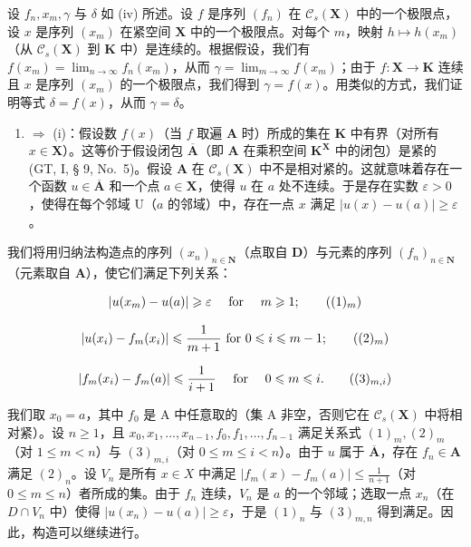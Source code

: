 设 \(f_n, x_m, \gamma\) 与 \(\delta\) 如 (iv) 所述。设 \(f\) 是序列 \((f_n)\) 在 \(\mathcal{C}_s(\mathbf{X})\) 中的一个极限点，设 \(x\) 是序列 \((x_m)\) 在紧空间 \(\mathbf{X}\) 中的一个极限点。对每个 \(m\)，映射 \(h \mapsto h(x_m)\)（从 \(\mathcal{C}_s(\mathbf{X})\) 到 \(\mathbf{K}\) 中）是连续的。根据假设，我们有 \(f(x_m) = \lim_{n \to \infty} f_n(x_m)\)，从而 \(\gamma = \lim_{m \to \infty} f(x_m)\)；由于 \(f: \mathbf{X} \to \mathbf{K}\) 连续且 \(x\) 是序列 \((x_m)\) 的一个极限点，我们得到 \(\gamma = f(x)\)。用类似的方式，我们证明等式 \(\delta = f(x)\)，从而 \(\gamma = \delta\)。

\begin{enumerate}
\def\labelenumi{(\roman{enumi})}
\setcounter{enumi}{3}
\tightlist
\item
  \(\Rightarrow\) (i)：假设数 \(f(x)\)（当 \(f\) 取遍 \(\mathbf{A}\) 时）所成的集在 \(\mathbf{K}\) 中有界（对所有 \(x\in \mathbf{X}\)）。这等价于假设闭包 \(\overline{\mathbf{A}}\)（即 \(\mathbf{A}\) 在乘积空间 \(\mathbf{K}^{\mathbf{X}}\) 中的闭包）是紧的 (GT, I, § 9, No.~5)。假设 \(\mathbf{A}\) 在 \(\mathcal{C}_s(\mathbf{X})\) 中不是相对紧的。这就意味着存在一个函数 \(u\in \overline{\mathbf{A}}\) 和一个点 \(a\in \mathbf{X}\)，使得 \(u\) 在 \(a\) 处不连续。于是存在实数 \(\varepsilon >0\)，使得在每个邻域 \(\mathrm{U}\)（\(a\) 的邻域）中，存在一点 \(x\) 满足 \(|u(x) - u(a)|\geqslant \varepsilon\)。
\end{enumerate}

我们将用归纳法构造点的序列 \((x_{n})_{n\in \mathbf{N}}\)（点取自 \(\mathbf{D}\)）与元素的序列 \((f_n)_{n\in \mathbf{N}}\)（元素取自 \(\mathbf{A}\)），使它们满足下列关系：

\[
\left| u (x _ {m}) - u (a) \right| \geqslant \varepsilon \quad \text { for } \quad m \geqslant 1;\tag{$(1)_{m}$}
\]

\[
\left| u (x _ {i}) - f _ {m} (x _ {i}) \right| \leqslant \frac {1}{m + 1} \text { for } 0 \leqslant i \leqslant m - 1;\tag{$(2)_{m}$}
\]

\[
\left| f _ {m} (x _ {i}) - f _ {m} (a) \right| \leqslant \frac {1}{i + 1} \quad \text { for } \quad 0 \leqslant m \leqslant i.\tag{$(3)_{m,i}$}
\]

我们取 \(x_0 = a\)，其中 \(f_0\) 是 A 中任意取的（集 A 非空，否则它在 \(\mathcal{C}_s(\mathbf{X})\) 中将相对紧）。设 \(n \geqslant 1\)，且 \(x_0, x_1, \ldots, x_{n-1}, f_0, f_1, \ldots, f_{n-1}\) 满足关系式 \((1)_m, (2)_m\)（对 \(1 \leqslant m < n\)）与 \((3)_{m,i}\)（对 \(0 \leqslant m \leqslant i < n\)）。由于 \(u\) 属于 \(\overline{\mathbf{A}}\)，存在 \(f_n \in \mathbf{A}\) 满足 \((2)_n\)。设 \(V_n\) 是所有 \(x \in X\) 中满足 \(|f_m(x) - f_m(a)| \leqslant \frac{1}{n+1}\)（对 \(0 \leqslant m \leqslant n\)）者所成的集。由于 \(f_n\) 连续，\(V_n\) 是 \(a\) 的一个邻域；选取一点 \(x_n\)（在 \(D \cap V_n\) 中）使得 \(|u(x_n) - u(a)| \geqslant \varepsilon\)，于是 \((1)_n\) 与 \((3)_{m,n}\) 得到满足。因此，构造可以继续进行。

